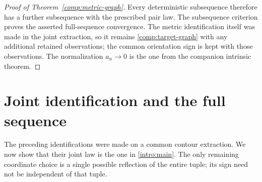 \documentclass[11pt]{article}
\numberwithin{equation}{section}
\theoremstyle{definition}
\theoremstyle{remark}
\newcommand{\1}{\mathbf 1}
\begin{document}
\begin{proof}[Proof of Theorem~\ref{comp:metric-graph}]
Every deterministic subsequence therefore has a further
subsequence with the prescribed pair law.  The subsequence
criterion proves the asserted full-sequence convergence.
The metric identification itself was made in the joint
extraction, so it remains \eqref{comp:target-graph} with any
additional retained observations; the common orientation sign
is kept with those observations.  The normalization $a_n\to0$
is the one from the companion intrinsic theorem.
\end{proof}

\section{Joint identification and the full sequence}\label{joint:section}

The preceding identifications were made on a common contour extraction.
We now show that their joint law is the one in \cref{intro:main}.
The only remaining coordinate choice is a single possible reflection
of the entire tuple; its sign need not be independent of that tuple.
\end{document}
